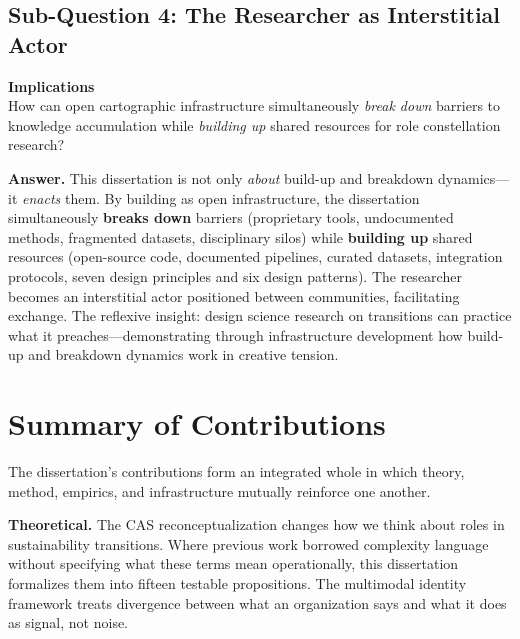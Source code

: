 \documentclass[../main.tex]{subfiles}
\begin{document}
\subsection{Sub-Question 4: The Researcher as Interstitial Actor}

\begin{subrq}
\textbf{Implications}\\
How can open cartographic infrastructure simultaneously \emph{break down} barriers to knowledge accumulation while \emph{building up} shared resources for role constellation research?
\end{subrq}

\noindent\textbf{Answer.} This dissertation is not only \emph{about} build-up and breakdown dynamics---it \emph{enacts} them. By building \RoleBox{} as open infrastructure, the dissertation simultaneously \textbf{breaks down} barriers (proprietary tools, undocumented methods, fragmented datasets, disciplinary silos) while \textbf{building up} shared resources (open-source code, documented pipelines, curated datasets, integration protocols, seven design principles and six design patterns). The researcher becomes an interstitial actor positioned between communities, facilitating exchange. The reflexive insight: design science research on transitions can practice what it preaches---demonstrating through infrastructure development how build-up and breakdown dynamics work in creative tension.


\section{Summary of Contributions}

The dissertation's contributions form an integrated whole in which theory, method, empirics, and infrastructure mutually reinforce one another.

\textbf{Theoretical.} The CAS reconceptualization changes how we think about roles in sustainability transitions. Where previous work borrowed complexity language without specifying what these terms mean operationally, this dissertation formalizes them into fifteen testable propositions. The multimodal identity framework treats divergence between what an organization says and what it does as signal, not noise.
\end{document}
